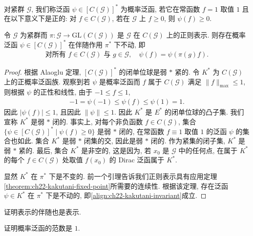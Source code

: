 \documentclass[../../main.tex]{subfiles}
\begin{document}
对紧群 $\mathcal{G}$, 我们称泛函 $\psi\in[C(\mathcal{G})]^{*}$ 为概率泛函, 若它在常函数 $f=1$ 取值 $1$ 且在以下意义下是正的: 对 $f\in C(\mathcal{G})$, 若在 $\mathcal{G}$ 上 $f\geqslant 0$, 则 $\psi(f)\geqslant 0$.

\begin{theorem}\label{theorem:ch22-kakutani}
令 $\mathcal{G}$ 为紧群而 $\pi:\mathcal{G}\to\mathrm{GL}(C(\mathcal{G}))$ 是 $\mathcal{G}$ 在 $C(\mathcal{G})$ 上的正则表示. 则存在概率泛函 $\psi\in[C(\mathcal{G})]^{*}$ 在伴随作用 $\pi^{*}$ 下不动, 即
\begin{align}
\text{对所有 }f\in C(\mathcal{G})\text{ 与 }g\in\mathcal{G},\quad\psi(f)=\psi(\pi(g)f).
\label{align:ch22-kakutani-invariant}
\end{align}
\end{theorem}

\begin{proof}
根据 Alaoglu 定理, $[C(\mathcal{G})]^{*}$ 的闭单位球是弱 $*$ 紧的. 令 $K^{*}$ 为 $C(\mathcal{G})$ 上的正概率泛函族. 观察到若 $\psi$ 是概率泛函而 $f$ 属于 $C(\mathcal{G})$ 满足 $\|f\|_{\max}\leqslant 1$, 则根据 $\psi$ 的正性和线性, 由于 $-1\leqslant f\leqslant 1$,
\begin{align*}
-1=\psi(-1)\leqslant\psi(f)\leqslant\psi(1)=1.
\end{align*}
因此 $|\psi(f)|\leqslant 1$, 且因此 $\|\psi\|\leqslant 1$. 因此 $K^{*}$ 是 $E^{*}$ 的闭单位球的凸子集. 我们宣称 $K^{*}$ 是弱 $*$ 闭的. 事实上, 对每个非负函数 $f\in C(\mathcal{G})$, 集合 $\{\psi\in[C(\mathcal{G})]^{*}\mid\psi(f)\geqslant 0\}$ 是弱 $*$ 闭的, 在常函数 $f\equiv 1$ 取值 $1$ 的泛函 $\psi$ 的集合也如此. 集合 $K^{*}$ 是弱 $*$ 闭集的交, 因此是弱 $*$ 闭的. 作为紧集的闭子集, $K^{*}$ 是弱 $*$ 紧的. 最后, 集合 $K^{*}$ 是非空的, 这是因为, 若 $x_{0}$ 是 $\mathcal{G}$ 中的任何点, 在属于 $K^{*}$ 的每个 $f\in C(\mathcal{G})$ 处取值 $f(x_{0})$ 的 Dirac 泛函属于 $K^{*}$.

显然 $K^{*}$ 在 $\pi^{*}$ 下是不变的. 前一个引理告诉我们正则表示具有应用定理\cref{theorem:ch22-kakutani-fixed-point}所需要的连续性. 根据该定理, 存在泛函 $\psi\in K^{*}$ 在 $\pi^{*}$ 下是不动的, 即\eqref{align:ch22-kakutani-invariant}成立.
\end{proof}

\begin{exercise}\label{exercise:ch22-13}
证明表示的伴随也是表示.
\end{exercise}

\begin{exercise}\label{exercise:ch22-14}
证明概率泛函的范数是 $1$.
\end{exercise}
\end{document}
